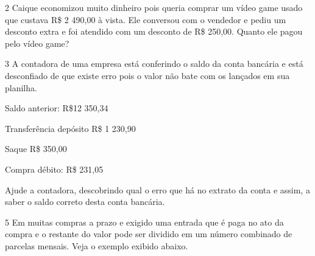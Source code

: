 

\num{2} Caique economizou muito dinheiro pois queria comprar um vídeo game
usado que custava R\$ 2 490,00 à vista. Ele conversou com o vendedor e
pediu um desconto extra e foi atendido com um desconto de R\$ 250,00.
Quanto ele pagou pelo vídeo game?



\num{3} A contadora de uma empresa está conferindo o saldo da conta
bancária e está desconfiado de que existe erro pois o valor não bate com
os lançados em sua planilha.


Saldo anterior: R\$12 350,34

Transferência depósito R\$ 1 230,90

Saque R\$ 350,00

Compra débito: R\$ 231,05

Ajude a contadora, descobrindo qual o erro que há no extrato da conta e
assim, a saber o saldo correto desta conta bancária.



\num{5} Em muitas compras a prazo e exigido uma entrada que é paga no ato
da compra e o restante do valor pode ser dividido em um número combinado
de parcelas mensais. Veja o exemplo exibido abaixo.

